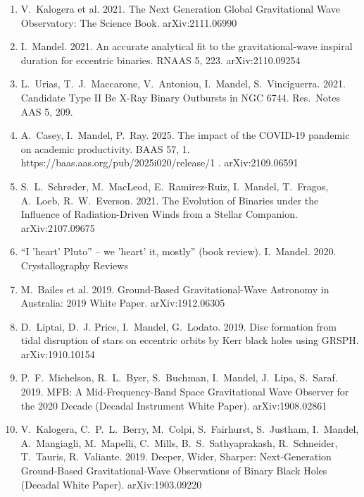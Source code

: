 \documentclass[margin,line]{res}
\begin{document}
\begin{resume}
\begin{enumerate}
\item V.~Kalogera et al.  2021. The Next Generation Global Gravitational Wave Observatory: The Science Book.  arXiv:2111.06990

\item I.~Mandel.  2021.  An accurate analytical fit to the gravitational-wave inspiral duration for eccentric binaries. RNAAS 5, 223. arXiv:2110.09254

\item L.~Urias, T.~J.~Maccarone, V.~Antoniou, I.~Mandel, S.~Vinciguerra.  2021.  Candidate Type II Be X-Ray Binary Outbursts in NGC 6744.  Res.~Notes AAS 5, 209.

\item A.~Casey, I.~Mandel, P.~Ray. 2025. The impact of the COVID-19 pandemic on academic productivity.  BAAS 57, 1. https://baas.aas.org/pub/2025i020/release/1 . arXiv:2109.06591

\item S.~L.~Schr{\o}der, M.~MacLeod, E.~Ramirez-Ruiz, I.~Mandel, T.~Fragos, A.~Loeb, R.~W.~Everson. 2021. The Evolution of Binaries under the Influence of Radiation-Driven Winds
  from a Stellar Companion.  arXiv:2107.09675

\item ``I 'heart' Pluto'' -- we 'heart' it, mostly'' (book review).  I.~Mandel.  2020.  Crystallography Reviews

\item M.~Bailes et al. 2019. Ground-Based Gravitational-Wave Astronomy in Australia: 2019 White Paper. arXiv:1912.06305

\item D.~Liptai, D.~J. Price, I.~Mandel, G.~Lodato.  2019.  Disc formation from tidal disruption of stars on eccentric orbits by Kerr black holes using GRSPH.  arXiv:1910.10154

\item P.~F.~Michelson, R.~L.~Byer, S.~Buchman, I.~Mandel, J.~Lipa, S.~Saraf.  2019. MFB: A Mid-Frequency-Band Space Gravitational Wave Observer for the 2020 Decade (Decadal Instrument White Paper). arXiv:1908.02861 

\item V.~Kalogera, C.~P.~L.~Berry, M.~Colpi, S.~Fairhurst, S.~Justham, I.~Mandel, A.~Mangiagli, M.~Mapelli, C.~Mills, B.~S.~Sathyaprakash, R.~Schneider, T.~Tauris, R.~Valiante. 2019.  Deeper, Wider, Sharper: Next-Generation Ground-Based Gravitational-Wave Observations of Binary Black Holes (Decadal White Paper).  arXiv:1903.09220 


\end{enumerate}
\end{resume}
\end{document}
